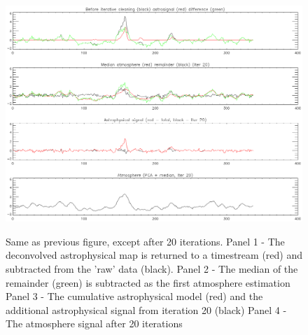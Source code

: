 \documentclass[12pt,preprint]{aastex}
\begin{document}
\begin{figure}
  \begin{minipage}{6.5in}
    \begin{center}
      \includegraphics[scale=0.9]{iterative_mapping3}
      \caption{Same as previous figure, except after 20 iterations.
      Panel 1 - The deconvolved astrophysical map is returned to a timestream (red)
      and subtracted from the 'raw' data (black). 
      Panel 2 - The median of the remainder (green) is subtracted as the first
      atmosphere estimation
      Panel 3 - The cumulative astrophysical model (red) and the additional astrophysical
      signal from iteration 20 (black)
      Panel 4 - The atmosphere signal after 20 iterations}
    \end{center}
    \label{fig:IterativeMapping-c}
  \end{minipage}
\end{figure}
\end{document}

